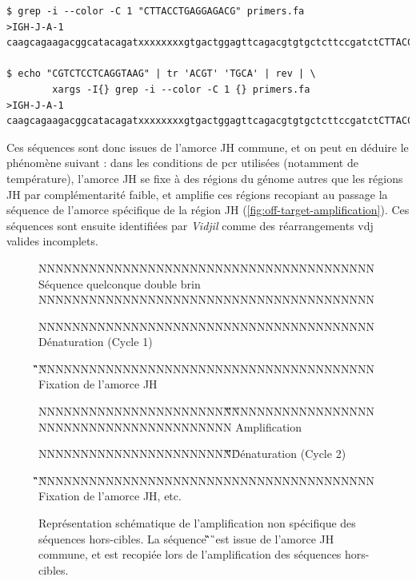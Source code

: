 \begin{lstlisting}[language=custombash, 
caption={Commande Bash et résultat de la recherche des séquences dans les amorces dégénérées.},
label={lst:bash-search-primer},
basicstyle=\ttfamily\scriptsize]
$ grep -i --color -C 1 "CTTACCTGAGGAGACG" primers.fa
>IGH-J-A-1
caagcagaagacggcatacagatxxxxxxxxgtgactggagttcagacgtgtgctcttccgatctCTTACCTGAGGAGACGgtgacc

$ echo "CGTCTCCTCAGGTAAG" | tr 'ACGT' 'TGCA' | rev | \
        xargs -I{} grep -i --color -C 1 {} primers.fa
>IGH-J-A-1
caagcagaagacggcatacagatxxxxxxxxgtgactggagttcagacgtgtgctcttccgatctCTTACCTGAGGAGACGgtgacc
\end{lstlisting}

\vspace{1em}

Ces séquences sont donc issues de l'amorce JH commune, et on peut en déduire le phénomène suivant :
dans les conditions de \gls{pcr} utilisées (notamment de température), l'amorce JH se fixe à des régions 
du génome autres que les régions JH par complémentarité faible, et amplifie ces régions recopiant au passage 
la séquence de l'amorce spécifique de la région JH (\autoref{fig:off-target-amplification}). Ces séquences sont ensuite 
identifiées par \textit{Vidjil} comme des réarrangements \gls{vdj} valides incomplets. 

\begin{figure}[H]
    \centering
    \begin{ColoredVerbatim}
        
        NNNNNNNNNNNNNNNNNNNNNNNNNNNNNNNNNNNNNNNN Séquence quelconque double brin
        NNNNNNNNNNNNNNNNNNNNNNNNNNNNNNNNNNNNNNNN

        NNNNNNNNNNNNNNNNNNNNNNNNNNNNNNNNNNNNNNNN Dénaturation (Cycle 1)

                               \C\G\T\C\T\C\C\T\C\A\G\G\T\A\A\G
        NNNNNNNNNNNNNNNNNNNNNNNNNNNNNNNNNNNNNNNN Fixation de l'amorce JH


        NNNNNNNNNNNNNNNNNNNNNNN\C\G\T\C\T\C\C\T\C\A\G\G\T\A\A\G
        NNNNNNNNNNNNNNNNNNNNNNNNNNNNNNNNNNNNNNNN Amplification

        NNNNNNNNNNNNNNNNNNNNNNN\C\G\T\C\T\C\C\T\C\A\G\G\T\A\A\G Dénaturation (Cycle 2)

                               \C\G\T\C\T\C\C\T\C\A\G\G\T\A\A\G
        NNNNNNNNNNNNNNNNNNNNNNNNNNNNNNNNNNNNNNNN Fixation de l'amorce JH, etc.
    \end{ColoredVerbatim}
    \caption{
        Représentation schématique de l'amplification non spécifique des séquences hors-cibles. 
        La séquence \C\G\T\C\T\C\C\T\C\A\G\G\T\A\A\G\ est issue de l'amorce JH commune, et est recopiée 
        lors de l'amplification des séquences hors-cibles.
    }
    \label{fig:off-target-amplification}
\end{figure}

